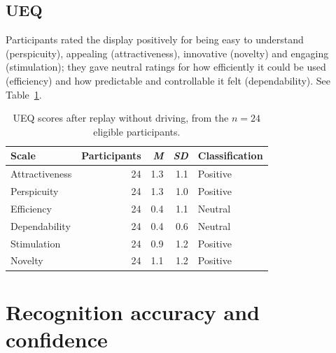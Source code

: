 \documentclass[
english,                 %
bibtex,                  %
includeExtraAbstracts, %
]{kththesis}
\newenvironment{evidenceblock}{\par\addvspace{6pt}\noindent\begin{minipage}{\linewidth}}{\end{minipage}\par\addvspace{6pt}}
\numberwithin{listing}{chapter}
\begin{document}
\subsection{UEQ}
\label{sec:ueq-results}

\begin{evidenceblock}
\normalsize
Participants rated the display positively for being easy to understand (perspicuity), appealing (attractiveness), innovative (novelty) and engaging (stimulation); they gave neutral ratings for how efficiently it could be used (efficiency) and how predictable and controllable it felt (dependability). See Table~\ref{tab:ueq-summaries}.

\begin{table}[H]
\centering
\scriptsize
\caption[UEQ scale summaries]{UEQ scores after replay without driving, from the $n = 24$ eligible participants.}
\label{tab:ueq-summaries}
\begin{tabular}{lrrrl}
\toprule
Scale & Participants & \textit{M} & \textit{SD} & Classification \\ \midrule
Attractiveness & 24 & 1.3 & 1.1 & Positive \\
Perspicuity & 24 & 1.3 & 1.0 & Positive \\
Efficiency & 24 & 0.4 & 1.1 & Neutral \\
Dependability & 24 & 0.4 & 0.6 & Neutral \\
Stimulation & 24 & 0.9 & 1.2 & Positive \\
Novelty & 24 & 1.1 & 1.2 & Positive \\
\bottomrule
\end{tabular}
\end{table}
\end{evidenceblock}

\section{Recognition accuracy and confidence}
\label{app:rq2-tables}
\end{document}
